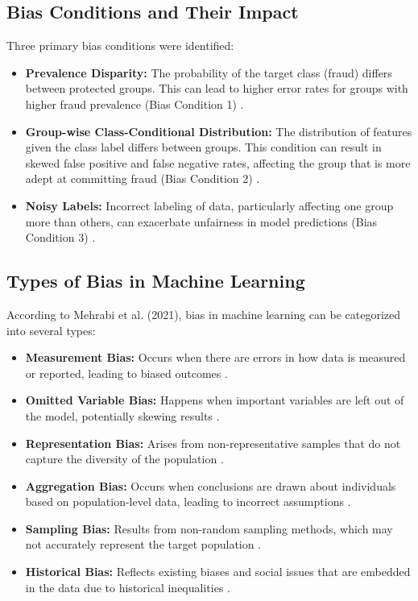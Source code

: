 \documentclass[12pt,a4paper]{report}
\begin{document}
\subsection{Bias Conditions and Their Impact}
Three primary bias conditions were identified:
\begin{itemize}
    \item \textbf{Prevalence Disparity:} The probability of the target class (fraud) differs between protected groups. This can lead to higher error rates for groups with higher fraud prevalence (Bias Condition 1) \citep{pombal2022understanding}.
    \item \textbf{Group-wise Class-Conditional Distribution:} The distribution of features given the class label differs between groups. This condition can result in skewed false positive and false negative rates, affecting the group that is more adept at committing fraud (Bias Condition 2) \citep{pombal2022understanding}.
    \item \textbf{Noisy Labels:} Incorrect labeling of data, particularly affecting one group more than others, can exacerbate unfairness in model predictions (Bias Condition 3) \citep{pombal2022understanding}.
\end{itemize}

\subsection{Types of Bias in Machine Learning}
According to Mehrabi et al. (2021), bias in machine learning can be categorized into several types:
\begin{itemize}
    \item \textbf{Measurement Bias:} Occurs when there are errors in how data is measured or reported, leading to biased outcomes \citep{mehrabi2021survey}.
    \item \textbf{Omitted Variable Bias:} Happens when important variables are left out of the model, potentially skewing results \citep{mehrabi2021survey}.
    \item \textbf{Representation Bias:} Arises from non-representative samples that do not capture the diversity of the population \citep{mehrabi2021survey}.
    \item \textbf{Aggregation Bias:} Occurs when conclusions are drawn about individuals based on population-level data, leading to incorrect assumptions \citep{mehrabi2021survey}.
    \item \textbf{Sampling Bias:} Results from non-random sampling methods, which may not accurately represent the target population \citep{mehrabi2021survey}.
    \item \textbf{Historical Bias:} Reflects existing biases and social issues that are embedded in the data due to historical inequalities \citep{mehrabi2021survey}.
\end{itemize}
\end{document}
